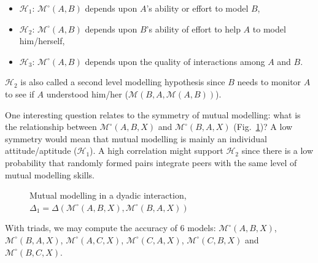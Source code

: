 \documentclass[natbib]{svjour3}
\newcommand{\Model}[3]{{$\mathcal{M}^{\circ}(#1, #2, #3)$}}
\begin{document}
\begin{itemize}
    \item $\mathcal{H}_{1}$: $\mathcal{M}^{\circ}(A,B)$ depends upon $A$'s ability or effort
        to model $B$,
    
    \item $\mathcal{H}_{2}$: $\mathcal{M}^{\circ}(A,B)$ depends upon  $B$'s ability of
        effort to help $A$ to model him/herself,

    \item $\mathcal{H}_{3}$: $\mathcal{M}^{\circ}(A,B)$ depends upon the quality of
        interactions among $A$ and $B$.

\end{itemize}



$\mathcal{H}_{2}$ is also called a second level modelling hypothesis since $B$
needs to monitor $A$ to see if $A$ understood him/her
($\mathcal{M}(B,A,\mathcal{M}(A,B))$).

One interesting question relates to the symmetry of mutual modelling: what is
the relationship between \Model{A}{B}{X} and
\Model{B}{A}{X} (Fig.~\ref{mm_symmetry})? A low symmetry would mean that mutual modelling is mainly an
individual attitude/aptitude ($\mathcal{H}_{1}$). A high correlation might
support $\mathcal{H}_{2}$ since there is a low probability that randomly formed
pairs integrate peers with the same level of mutual modelling skills.

\begin{figure}[htb]
\centering


\caption{\small Mutual modelling in a dyadic interaction, $\Delta_1 =
    \Delta(\mathcal{M}^{\circ} (A,B,X),
\mathcal{M}^{\circ} (B,A,X))$}

\label{mm_symmetry}
\end{figure}


With triads, we may compute the accuracy of 6 models:
\Model{A}{B}{X}, \Model{B}{A}{X}, \Model{A}{C}{X}, \Model{C}{A}{X},
\Model{C}{B}{X} and \Model{B}{C}{X}.
\end{document}

